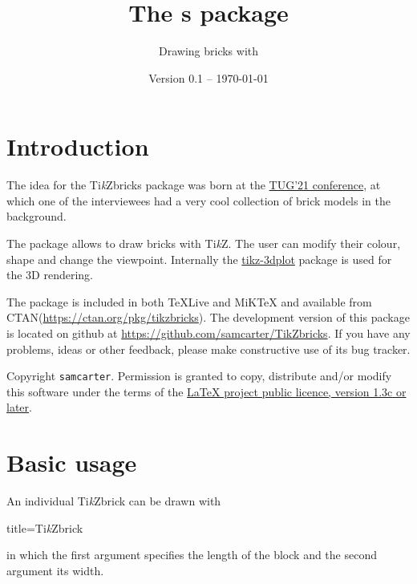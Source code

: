 \documentclass[parskip=half]{scrartcl}
\title{The \tikzbrick{}s package}
\subtitle{Drawing bricks with \TikZ}
\author{%
	\texorpdfstring{
		\begin{tikzpicture}
			 \brick[color=blue]{4}{2}
		\end{tikzpicture}\\[0.8em]		
		\texttt{samcarter}\\
		\url{https://github.com/samcarter/TikZbricks}\\
		\url{https://www.ctan.org/pkg/tikzbricks}
	}{samcarter}}
\date{Version 0.1 -- \today}
\newcommand{\CTAN}{\textsc{CTAN}\xspace}
\newcommand{\TikZ}{Ti\emph{k}Z\xspace}
\newcommand{\miktex}{MiK\TeX\xspace}
\newcommand{\texlive}{\TeX{}Live\xspace}
\newcommand{\tikzbrick}{Ti\emph{k}Zbrick\xspace}
\begin{document}
\maketitle
\thispagestyle{scrheadings}

\section{Introduction}
\label{intro}

The idea for the \tikzbrick{}s package was born at the \href{https://tug.org/tug2021/}{TUG'21 conference}, at which one of the interviewees had a very cool collection of brick models in the background. %

The package allows to draw bricks with \TikZ. The user can modify their colour, shape and change the viewpoint. Internally the \href{https://ctan.org/pkg/tikz-3dplot}{tikz-3dplot} package is used for the 3D rendering. 

The package is included in both \texlive and \miktex and available from \CTAN (\url{https://ctan.org/pkg/tikzbricks}).  
The development version of this package is located on github at \url{https://github.com/samcarter/TikZbricks}. If you have any problems, ideas or other feedback, please make constructive use of its bug tracker.

Copyright  \texttt{samcarter}. Permission is granted to copy, distribute and\slash or modify this software under the terms of the \href{http://www.latex-project.org/lppl.txt}{LaTeX project public licence, version 1.3c or later}.

\section{Basic usage}

An individual \tikzbrick can be drawn with
\begin{tcblisting}{title={\tikzbrick}}
\end{tcblisting}
in which the first argument specifies the length of the block and the second argument its width. 
\end{document}
